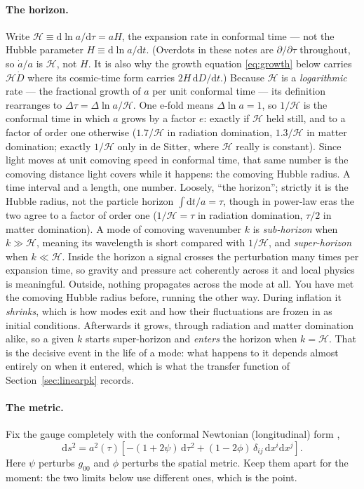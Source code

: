 \documentclass[a4paper,11pt]{article}
\def\cH{\mathcal{H}}
\newcommand{\dd}{\mathrm{d}}
\numberwithin{equation}{section}
\begin{document}
\paragraph{The horizon.} Write $\cH \equiv \dd\ln a/\dd\tau = aH$, the expansion
rate in conformal time --- not the Hubble parameter $H \equiv \dd\ln a/\dd t$.
(Overdots in these notes are $\partial/\partial\tau$ throughout, so $\dot a/a$ is
$\cH$, not $H$. It is also why the growth equation \eqref{eq:growth} below
carries $\cH\dot D$ where its cosmic-time form carries $2H\,\dd D/\dd t$.)
Because $\cH$ is a
\emph{logarithmic} rate --- the fractional growth of $a$ per unit conformal time
--- its definition rearranges to $\Delta\tau = \Delta\ln a/\cH$. One e-fold means
$\Delta\ln a = 1$, so $1/\cH$ is the conformal time in which $a$ grows by a
factor $e$: exactly if $\cH$ held still, and to a factor of order one otherwise
($1.7/\cH$ in radiation domination, $1.3/\cH$ in matter domination; exactly
$1/\cH$ only in de Sitter, where $\cH$ really is constant). Since light moves at
unit comoving speed in conformal time, that same number is the comoving distance
light covers while it happens: the comoving Hubble radius. A time interval and a
length, one number. Loosely, ``the horizon''; strictly it is the Hubble radius, not
the particle horizon $\int\!\dd t/a = \tau$, though in power-law eras the two
agree to a factor of order one ($1/\cH = \tau$ in radiation domination,
$\tau/2$ in matter domination). A mode of comoving wavenumber $k$ is
\emph{sub-horizon} when $k \gg \cH$, meaning its wavelength is short compared
with $1/\cH$, and \emph{super-horizon} when $k \ll \cH$. Inside the horizon a
signal crosses the perturbation many times per expansion time, so gravity and
pressure act coherently across it and local physics is meaningful. Outside,
nothing propagates across the mode at all. You have met the comoving Hubble radius before, running the other way. During
inflation it \emph{shrinks}, which is how modes exit and how their fluctuations
are frozen in as initial conditions. Afterwards it grows, through radiation and
matter domination alike, so a given $k$ starts super-horizon and \emph{enters}
the horizon when $k = \cH$. That is the decisive event in the life of a mode:
what happens to it depends almost entirely on when it entered, which is what the
transfer function of Section~\ref{sec:linearpk} records.

\paragraph{The metric.} Fix the gauge completely with the conformal Newtonian
(longitudinal) form \cite{MaBertschinger1995},
\begin{equation}
\dd s^2 = a^2(\tau)\left[-(1+2\psi)\,\dd\tau^2 + (1-2\phi)\,\delta_{ij}\,\dd x^i\dd x^j\right] .
\label{eq:newtonian_gauge}
\end{equation}
Here $\psi$ perturbs $g_{00}$ and $\phi$ perturbs the spatial metric. Keep them
apart for the moment: the two limits below use different ones, which is the
point.
\end{document}
